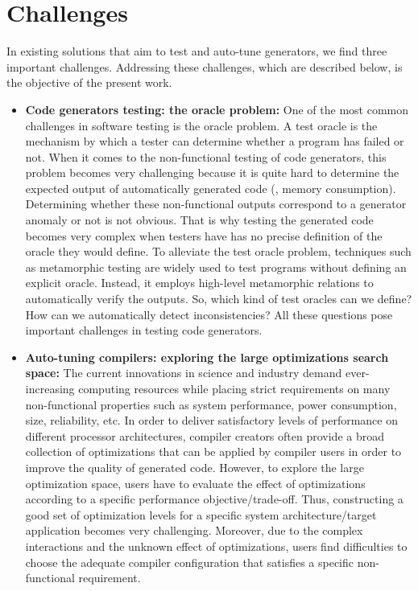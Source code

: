 \section{Challenges}
In existing solutions that aim to test and auto-tune generators, we find three important challenges. Addressing these challenges, which are described below, is the objective of the present work.
\begin{itemize}
\item
\textbf{Code generators testing: the oracle problem:} One of the most common challenges in software testing is the oracle problem. A test oracle is the mechanism by which a tester can determine whether a program has failed or not.
When it comes to the non-functional testing of code generators, this problem becomes very challenging because it is quite hard to determine the expected output of automatically generated code (\eg, memory consumption). Determining whether these non-functional outputs correspond to a generator anomaly or not is not obvious. That is why testing the generated code becomes very complex when testers have has no precise definition of the oracle they would define. 
To alleviate the test oracle problem, techniques such as metamorphic testing\cite{chen1998metamorphic} are widely used to test programs without defining an explicit oracle. Instead, it employs high-level metamorphic relations to automatically verify the outputs.
So, which kind of test oracles can we define? How can we automatically detect inconsistencies? All these questions pose important challenges in testing code generators.


\item
\textbf{Auto-tuning compilers: exploring the large optimizations search space:} The current innovations in science and industry demand ever-increasing computing resources while placing strict requirements on many non-functional properties such as system performance, power consumption, size, reliability, etc. In order to deliver satisfactory levels of performance on different processor architectures, compiler creators often provide a broad collection of optimizations that can be applied by compiler users in order to improve the quality of generated code. However, to explore the large optimization space, users have to evaluate the effect of optimizations according to a specific performance objective/trade-off. Thus, constructing a good set of optimization levels for a specific system architecture/target application becomes very challenging. Moreover, due to the complex interactions and the unknown effect of optimizations, users find difficulties to choose the adequate compiler configuration that satisfies a specific non-functional requirement.


\end{itemize}
